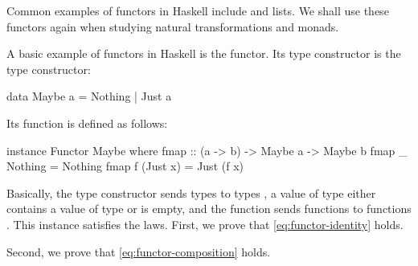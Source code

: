 Common examples of functors in Haskell include  and
lists. We shall use these functors again when studying natural
transformations and monads.

\begin{example}
  \label{ex:functor-maybe-haskell}


  A basic example of functors in Haskell is the 
  functor. Its type constructor is the  type
  constructor:
  \begin{codehaskell}
data Maybe a = Nothing | Just a
  \end{codehaskell}
  Its  function is defined as follows:
  \begin{codehaskell}
instance Functor Maybe where
  fmap :: (a -> b) -> Maybe a -> Maybe b
  fmap _ Nothing  = Nothing
  fmap f (Just x) = Just (f x)
  \end{codehaskell}
  Basically, the  type constructor sends types
   to types , a value of type
   either contains a value of type
   or is empty, and the  function
  sends functions  to functions . This instance satisfies the laws. First, we prove
  that \eqref{eq:functor-identity} holds.

  \vspace{1em}
  \begin{steps}
  \end{steps}
  \begin{steps}
  \end{steps}
  Second, we prove that \eqref{eq:functor-composition} holds.

  \vspace{1em}
  \begin{steps}
  \end{steps}
  \begin{steps}
  \end{steps}

\end{example}

